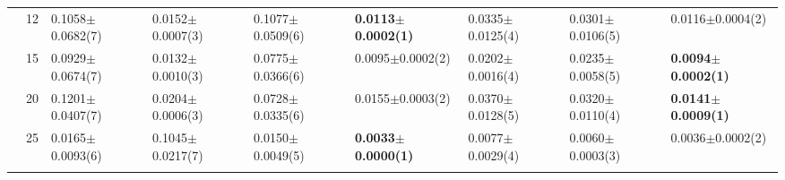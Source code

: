 \begin{table*}[htbp]
\begin{adjustbox}{width=1.0\textwidth,center}
\begin{tabular}{lllllllll}
      & 12                             & 0.1058$\pm$0.0682(7)         & 0.0152$\pm$0.0007(3)          & 0.1077$\pm$0.0509(6)              & \textbf{0.0113$\pm$0.0002(1)} & 0.0335$\pm$0.0125(4)                              & 0.0301$\pm$0.0106(5)                     & 0.0116$\pm$0.0004(2)          \\
      & 15                             & 0.0929$\pm$0.0674(7)         & 0.0132$\pm$0.0010(3)          & 0.0775$\pm$0.0366(6)              & 0.0095$\pm$0.0002(2)          & 0.0202$\pm$0.0016(4)                              & 0.0235$\pm$0.0058(5)                     & \textbf{0.0094$\pm$0.0002(1)} \\
      & 20                             & 0.1201$\pm$0.0407(7)         & 0.0204$\pm$0.0006(3)          & 0.0728$\pm$0.0335(6)              & 0.0155$\pm$0.0003(2)          & 0.0370$\pm$0.0128(5)                              & 0.0320$\pm$0.0110(4)                     & \textbf{0.0141$\pm$0.0009(1)} \\
      & 25                             & 0.0165$\pm$0.0093(6)         & 0.1045$\pm$0.0217(7)          & 0.0150$\pm$0.0049(5)              & \textbf{0.0033$\pm$0.0000(1)} & 0.0077$\pm$0.0029(4)                              & 0.0060$\pm$0.0003(3)                     & 0.0036$\pm$0.0002(2)          \\\thickhline

\end{tabular}
\end{adjustbox}
\end{table*}
